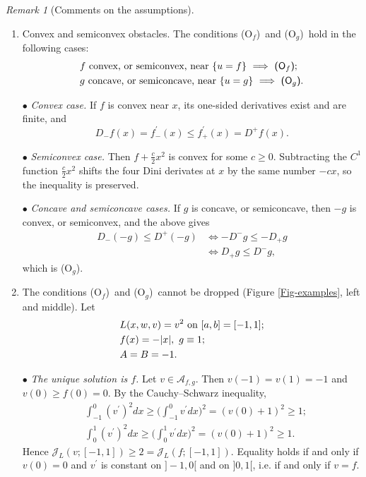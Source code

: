 \documentclass[reqno,12pt]{amsart}
\numberwithin{equation}{section}
\def\J{\mathcal{J}_L}
\def\A{\mathcal{A}_{f,g}}
\def\Of{{\sf (O$_f$)}}
\def\Og{{\sf (O$_g$)}}
\theoremstyle{remark}
\newtheorem{remark}[theorem]{Remark}
\begin{document}
\begin{remark}[Comments on the assumptions]\label{Remark-on-results}
\begin{enumerate}[leftmargin=2em, itemsep=1em, topsep=0.6em]
\item[(a)] {\sf Convex and semiconvex obstacles.} The conditions \Of\ and \Og\ hold in the following cases:
\begin{align*}
&f\hbox{ convex, or semiconvex, near }\{u=f\}\ \Longrightarrow\ \hbox{\Of};\\
&g\hbox{ concave, or semiconcave, near }\{u=g\}\ \Longrightarrow\ \hbox{\Og}.
\end{align*}

\smallskip
$\scriptstyle\bullet$ {\em Convex case.} If $f$ is convex near $x$, its one-sided derivatives exist and are finite, and
\begin{equation*}
D_-f(x)=f^\prime_-(x)\leq f^\prime_+(x)=D^+f(x).
\end{equation*}

\smallskip
$\scriptstyle\bullet$ {\em Semiconvex case.} Then $f+\frac c2x^2$ is convex for some $c\geq0$. Subtracting the $C^1$ function $\frac c2x^2$ shifts the four Dini derivates at $x$ by the same number $-cx$, so the inequality is preserved.

\smallskip
$\scriptstyle\bullet$ {\em Concave and semiconcave cases.} If $g$ is concave, or semiconcave, then $-g$ is convex, or semiconvex, and the above gives
\begin{align*}
D_-(-g)\leq D^+(-g)&\iff -D^-g\leq-D_+g\\
&\iff D_+g\leq D^-g,
\end{align*}
which is \Og.

\item[(b)] {\sf The conditions \Of\ and \Og\ cannot be dropped} (Figure \ref{Fig-examples}, left and middle). Let
\begin{align*}
&L(x,w,v)=v^2\hbox{ on }[a,b]=[-1,1];\\
&f(x)=-|x|,\ g\equiv1;\\
&A=B=-1.
\end{align*}

\smallskip
$\scriptstyle\bullet$ {\em The unique solution is $f$.} Let $v\in\A$. Then $v(-1)=v(1)=-1$ and $v(0)\geq f(0)=0$. By the Cauchy--Schwarz inequality,
\begin{align*}
&\int_{-1}^0(v^\prime)^2dx\geq\Big(\int_{-1}^0v^\prime dx\Big)^2=(v(0)+1)^2\geq1;\\
&\int_0^1(v^\prime)^2dx\geq\Big(\int_0^1v^\prime dx\Big)^2=(v(0)+1)^2\geq1.
\end{align*}
Hence $\J(v;[-1,1])\geq2=\J(f;[-1,1])$. Equality holds if and only if $v(0)=0$ and $v^\prime$ is constant on $]-1,0[$ and on $]0,1[$, i.e. if and only if $v=f$.


\end{enumerate}
\end{remark}
\end{document}
